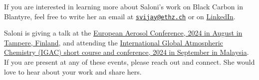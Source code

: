 \documentclass[
  letterpaper,
  DIV=11,
  numbers=noendperiod]{scrartcl}
\begin{document}
If you are interested in learning more about Saloni's work on Black
Carbon in Blantyre, feel free to write her an email at
\href{mailto:svijay@ethz.ch}{\nolinkurl{svijay@ethz.ch}} or on
\href{https://www.linkedin.com/in/saloni-vijay-9b9a51a7/}{LinkedIn}.

Saloni is giving a talk at the \href{https://www.eac2024.fi/}{European
Aerosol Conference, 2024 in August in Tampere, Finland}, and attending
the \href{https://icacgp-igac2024.com/}{International Global Atmospheric
Chemistry (IGAC) short course and conference, 2024 in September in
Malaysia}. If you are present at any of these events, please reach out
and connect. She would love to hear about your work and share hers.
\end{document}
